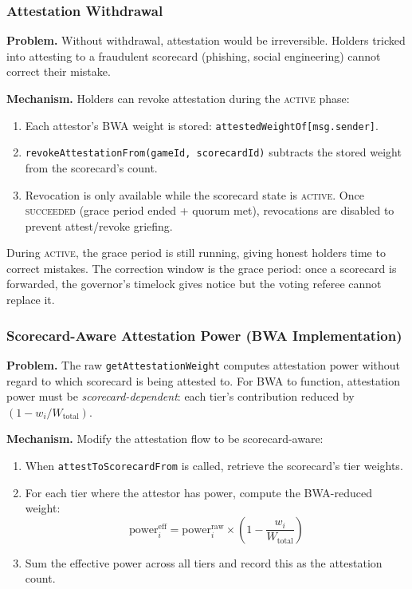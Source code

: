 \documentclass[11pt,a4paper]{article}
\begin{document}
\subsubsection{Attestation Withdrawal}

\textbf{Problem.} Without withdrawal, attestation would be irreversible. Holders tricked into attesting to a fraudulent scorecard (phishing, social engineering) cannot correct their mistake.

\textbf{Mechanism.} Holders can revoke attestation during the \textsc{active} phase:
\begin{enumerate}[nosep]
\item Each attestor's BWA weight is stored: \texttt{attestedWeightOf[msg.sender]}.
\item \texttt{revokeAttestationFrom(gameId, scorecardId)} subtracts the stored weight from the scorecard's count.
\item Revocation is only available while the scorecard state is \textsc{active}. Once \textsc{succeeded} (grace period ended + quorum met), revocations are disabled to prevent attest/revoke griefing.
\end{enumerate}

During \textsc{active}, the grace period is still running, giving honest holders time to correct mistakes. The correction window is the grace period: once a scorecard is forwarded, the governor's timelock gives notice but the voting referee cannot replace it.

\subsubsection{Scorecard-Aware Attestation Power (BWA Implementation)}

\textbf{Problem.} The raw \texttt{getAttestationWeight} computes attestation power without regard to which scorecard is being attested to. For BWA to function, attestation power must be \emph{scorecard-dependent}: each tier's contribution reduced by $(1 - w_i / W_{\text{total}})$.

\textbf{Mechanism.} Modify the attestation flow to be scorecard-aware:
\begin{enumerate}[nosep]
\item When \texttt{attestToScorecardFrom} is called, retrieve the scorecard's tier weights.
\item For each tier where the attestor has power, compute the BWA-reduced weight:
\[
\text{power}_i^{\text{eff}} = \text{power}_i^{\text{raw}} \times \left(1 - \frac{w_i}{W_{\text{total}}}\right)
\]
\item Sum the effective power across all tiers and record this as the attestation count.
\end{enumerate}
\end{document}
